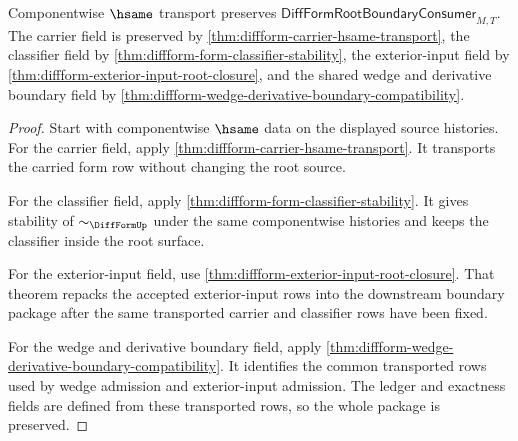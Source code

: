 \begin{theorem}
\label{thm:diffform-root-boundary-consumer-classifier-scope}
Componentwise $\hsame$ transport preserves
$\mathsf{DiffFormRootBoundaryConsumer}_{M,T}$. The carrier field is preserved
by \autoref{thm:diffform-carrier-hsame-transport}, the classifier field by
\autoref{thm:diffform-form-classifier-stability}, the exterior-input field by
\autoref{thm:diffform-exterior-input-root-closure}, and the shared wedge and
derivative boundary field by
\autoref{thm:diffform-wedge-derivative-boundary-compatibility}.
\end{theorem}
\begin{proof}
Start with componentwise $\hsame$ data on the displayed source histories.
For the carrier field, apply
\autoref{thm:diffform-carrier-hsame-transport}. It transports the carried
form row without changing the root source.

For the classifier field, apply
\autoref{thm:diffform-form-classifier-stability}. It gives stability of
$\sim_{\DiffFormUp}$ under the same componentwise histories and keeps the
classifier inside the root surface.

For the exterior-input field, use
\autoref{thm:diffform-exterior-input-root-closure}. That theorem repacks the
accepted exterior-input rows into the downstream boundary package after the
same transported carrier and classifier rows have been fixed.

For the wedge and derivative boundary field, apply
\autoref{thm:diffform-wedge-derivative-boundary-compatibility}. It identifies
the common transported rows used by wedge admission and exterior-input
admission. The ledger and exactness fields are defined from these transported
rows, so the whole package is preserved.
\end{proof}

